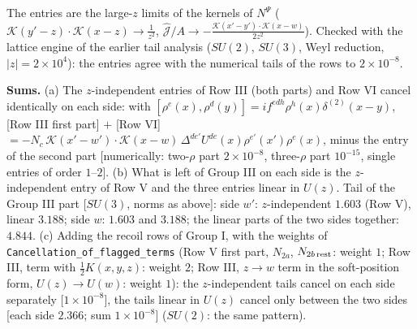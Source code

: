 \documentclass[9pt]{article}
\numberwithin{equation}{section}
\begin{document}
{\color{gray}\small The entries are the large-$z$ limits of the kernels of $N^{\Psi}$ ($\mathcal{K}(y'-z)\cdot\mathcal{K}(x-z)\to\frac{1}{z^{2}}$, $\widehat{\mathcal{J}}/A\to-\frac{\mathcal{K}(x'-y')\cdot\mathcal{K}(x-w)}{2z^{2}}$). Checked with the lattice engine of the earlier tail analysis ($SU(2)$, $SU(3)$, Weyl reduction, $|z|=2\times10^{4}$): the entries agree with the numerical tails of the rows to $2\times10^{-8}$.}\par\smallskip
\noindent\textbf{Sums.} (a) The $z$-independent entries of Row III (both parts) and Row VI cancel identically on each side: with $[\rho^{e}(x),\rho^{d}(y)]=if^{edh}\rho^{h}(x)\delta^{(2)}(x-y)$, [Row III first part] $+$ [Row VI] $=-N_{c}\,\mathcal{K}(x'-w')\cdot\mathcal{K}(x-w)\,\Delta^{de'}U^{de}(x)\rho^{e'}(x')\rho^{e}(x)$, minus the entry of the second part [numerically: two-$\rho$ part $2\times10^{-8}$, three-$\rho$ part $10^{-15}$, single entries of order $1$--$2$]. (b) What is left of Group III on each side is the $z$-independent entry of Row V and the three entries linear in $U(z)$. Tail of the Group III part [$SU(3)$, norms as above]: side $w'$: $z$-independent $1.603$ (Row V), linear $3.188$; side $w$: $1.603$ and $3.188$; the linear parts of the two sides together: $4.844$. (c) Adding the recoil rows of Group I, with the weights of \texttt{Cancellation\_of\_flagged\_terms} (Row V first part, $N_{2a}$, $N_{2b\,\rm rest}$: weight $1$; Row III, term with $\frac12K(x,y,z)$: weight $2$; Row III, $z\to w$ term in the soft-position form, $U(z)\to U(w)$: weight $1$): the $z$-independent tails cancel on each side separately [$1\times10^{-8}$], the tails linear in $U(z)$ cancel only between the two sides [each side $2.366$; sum $1\times10^{-8}$] ($SU(2)$: the same pattern).\par\smallskip
\end{document}
